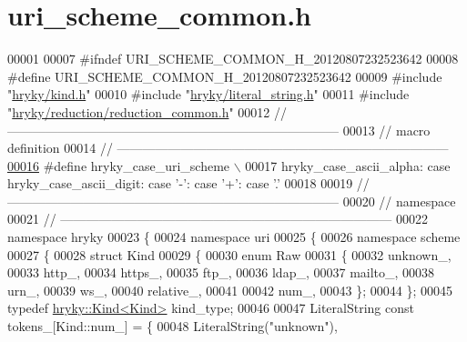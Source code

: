 \hypertarget{uri__scheme__common_8h_source}{\section{uri\-\_\-scheme\-\_\-common.\-h}
}

\begin{DoxyCode}
00001 
00007 \textcolor{preprocessor}{#ifndef URI\_SCHEME\_COMMON\_H\_20120807232523642}
00008 \textcolor{preprocessor}{}\textcolor{preprocessor}{#define URI\_SCHEME\_COMMON\_H\_20120807232523642}
00009 \textcolor{preprocessor}{}\textcolor{preprocessor}{#include "\hyperlink{kind_8h}{hryky/kind.h}"}
00010 \textcolor{preprocessor}{#include "\hyperlink{literal__string_8h}{hryky/literal_string.h}"}
00011 \textcolor{preprocessor}{#include "\hyperlink{reduction__common_8h}{hryky/reduction/reduction_common.h}"}
00012 \textcolor{comment}{//
      ------------------------------------------------------------------------------}
00013 \textcolor{comment}{// macro definition}
00014 \textcolor{comment}{//
      ------------------------------------------------------------------------------}
\hypertarget{uri__scheme__common_8h_source_l00016}{}\hyperlink{uri__scheme__common_8h_abdf0fd82f1a966acb12b3b8609b13518}{00016} \textcolor{comment}{}\textcolor{preprocessor}{#define hryky\_case\_uri\_scheme \(\backslash\)}
00017 \textcolor{preprocessor}{hryky\_case\_ascii\_alpha: case hryky\_case\_ascii\_digit: case '-': case '+': case
       '.'}
00018 \textcolor{preprocessor}{}
00019 \textcolor{comment}{//
      ------------------------------------------------------------------------------}
00020 \textcolor{comment}{// namespace}
00021 \textcolor{comment}{//
      ------------------------------------------------------------------------------}
00022 \textcolor{keyword}{namespace }hryky
00023 \{
00024 \textcolor{keyword}{namespace }uri
00025 \{
00026 \textcolor{keyword}{namespace }scheme
00027 \{
00028     \textcolor{keyword}{struct }Kind
00029     \{
00030         \textcolor{keyword}{enum} Raw
00031         \{
00032             unknown\_,
00033             http\_,
00034             https\_,
00035             ftp\_,
00036             ldap\_,
00037             mailto\_,
00038             urn\_,
00039             ws\_,
00040             relative\_,
00041             
00042             num\_,
00043         \};
00044     \};
00045     \textcolor{keyword}{typedef} \hyperlink{classhryky_1_1_kind}{hryky::Kind<Kind>} kind\_type;
00046 
00047     LiteralString \textcolor{keyword}{const} tokens\_[Kind::num\_] = \{
00048         LiteralString(\textcolor{stringliteral}{"unknown"}),

\end{DoxyCode}
